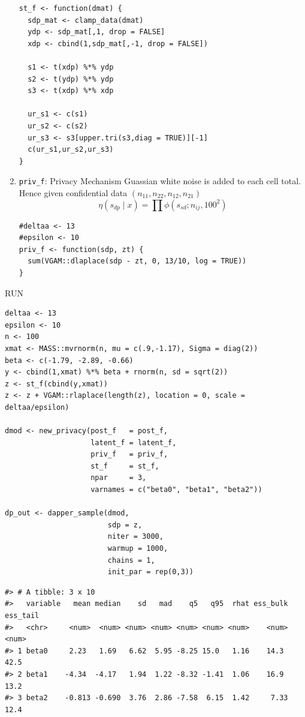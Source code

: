 \begin{enumerate}
\begin{verbatim}
st_f <- function(dmat) {
  sdp_mat <- clamp_data(dmat)
  ydp <- sdp_mat[,1, drop = FALSE]
  xdp <- cbind(1,sdp_mat[,-1, drop = FALSE])

  s1 <- t(xdp) %*% ydp
  s2 <- t(ydp) %*% ydp
  s3 <- t(xdp) %*% xdp

  ur_s1 <- c(s1)
  ur_s2 <- c(s2)
  ur_s3 <- s3[upper.tri(s3,diag = TRUE)][-1]
  c(ur_s1,ur_s2,ur_s3)
}
\end{verbatim}
\item
  \texttt{priv\_f}: Privacy Mechanism
  Guassian white noise is added to each cell total. Hence given
  confidential data \((n_{11}, n_{22}, n_{12}, n_{21})\)
  \[
  \eta(s_{dp} \mid x) = \prod \phi(s_{sd}; n_{ij}, 100^2)
  \]

\begin{verbatim}
#deltaa <- 13
#epsilon <- 10
priv_f <- function(sdp, zt) {
  sum(VGAM::dlaplace(sdp - zt, 0, 13/10, log = TRUE))
}
\end{verbatim}
\end{enumerate}

RUN

\begin{verbatim}
deltaa <- 13
epsilon <- 10
n <- 100
xmat <- MASS::mvrnorm(n, mu = c(.9,-1.17), Sigma = diag(2))
beta <- c(-1.79, -2.89, -0.66)
y <- cbind(1,xmat) %*% beta + rnorm(n, sd = sqrt(2))
z <- st_f(cbind(y,xmat))
z <- z + VGAM::rlaplace(length(z), location = 0, scale = deltaa/epsilon)

dmod <- new_privacy(post_f   = post_f,
                    latent_f = latent_f,
                    priv_f   = priv_f,
                    st_f     = st_f,
                    npar     = 3,
                    varnames = c("beta0", "beta1", "beta2"))

dp_out <- dapper_sample(dmod,
                        sdp = z,
                        niter = 3000,
                        warmup = 1000,
                        chains = 1,
                        init_par = rep(0,3))
\end{verbatim}

\begin{verbatim}
#> # A tibble: 3 x 10
#>   variable   mean median    sd   mad    q5   q95  rhat ess_bulk ess_tail
#>   <chr>     <num>  <num> <num> <num> <num> <num> <num>    <num>    <num>
#> 1 beta0     2.23   1.69   6.62  5.95 -8.25 15.0   1.16    14.3      42.5
#> 2 beta1    -4.34  -4.17   1.94  1.22 -8.32 -1.41  1.06    16.9      13.2
#> 3 beta2    -0.813 -0.690  3.76  2.86 -7.58  6.15  1.42     7.33     12.4
\end{verbatim}

